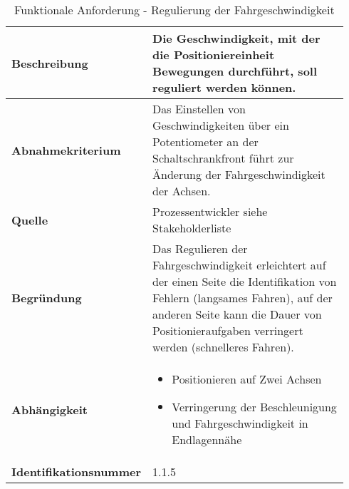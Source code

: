 \documentclass[../../../Bachelorarbeit.tex]{subfiles}
\begin{document}
\begin{table}[H]
    \centering
    \begin{tabular}{| p{0.34\linewidth} | p{0.6\linewidth} |}
        \hline
        \textbf{Beschreibung} & Die Geschwindigkeit, mit der die Positioniereinheit Bewegungen durchführt, soll reguliert werden können. \\ \hline
        \textbf{Abnahmekriterium} & Das Einstellen von Geschwindigkeiten über ein Potentiometer an der Schaltschrankfront führt zur Änderung der Fahrgeschwindigkeit der Achsen. \\ \hline
        \textbf{Quelle} & Prozessentwickler siehe Stakeholderliste \\ \hline
        \textbf{Begründung} & Das Regulieren der Fahrgeschwindigkeit erleichtert auf der einen Seite die Identifikation von Fehlern (langsames Fahren), auf der anderen Seite kann die Dauer von Positionieraufgaben verringert werden (schnelleres Fahren). \\ \hline
        \textbf{Abhängigkeit} & {\begin{itemize}[noitemsep,topsep=0pt,parsep=0pt,partopsep=0pt,leftmargin=*]
            \item Positionieren auf Zwei Achsen
            \item Verringerung der Beschleunigung und Fahrgeschwindigkeit in Endlagennähe
        \end{itemize}} \\ \hline
        \textbf{Identifikationsnummer} & 1.1.5 \\ \hline
    \end{tabular}
    \caption[\acs{fa} - Regulierung der Fahrgeschwindigkeit]{Funktionale Anforderung - Regulierung der Fahrgeschwindigkeit}
    \label{tab:my-table5}
\end{table}
\end{document}
